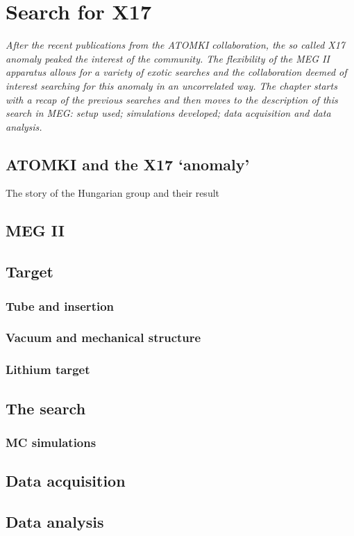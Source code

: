 \chapter{Search for X17}
\begin{refsection}
\label{ch:X17}
{\itshape After the recent publications from the ATOMKI collaboration, the so called X17 anomaly peaked the interest of the community. The flexibility of the MEG II apparatus allows for a variety of exotic searches and the collaboration deemed of interest searching for this anomaly in an uncorrelated way.
The chapter starts with a recap of the previous searches and then moves to the description of this search in MEG: setup used; simulations developed; data acquisition and data analysis.}

\section{ATOMKI and the X17 `anomaly'}
The story of the Hungarian group and their result
\section{MEG II}
\section{Target}
\subsection{Tube and insertion}
\subsection{Vacuum and mechanical structure}
\subsection{Lithium target}
\section{The search}
\subsection{MC simulations}
\section{Data acquisition}
\section{Data analysis}

\end{refsection}

